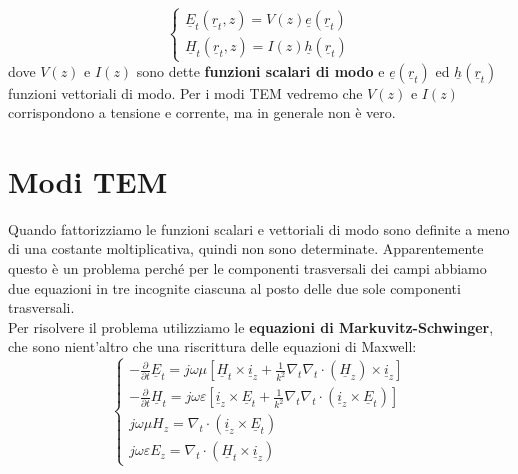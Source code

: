 \documentclass{book}
\begin{document}
        \begin{equation}
            \label{eqn:fattorizzazione_modi}
            \begin{cases}
                \underline{E}_{t}(\underline{r}_{t},z)=V(z)\underline{e}(\underline{r}_{t}) \\
                \underline{H}_{t}(\underline{r}_{t},z)=I(z)\underline{h}(\underline{r}_{t})
            \end{cases}
        \end{equation}
        dove $V(z)$ e $I(z)$ sono dette \textbf{funzioni scalari di modo} e $\underline{e}(\underline{r}_{t})$ ed $\underline{h}(\underline{r}_{t})$ funzioni 
        vettoriali di modo. Per i modi TEM vedremo che $V(z)$ e $I(z)$ corrispondono a tensione e corrente, ma in generale non è vero.
    \section{Modi TEM}
    Quando fattorizziamo le funzioni scalari e vettoriali di modo sono definite a meno di una costante moltiplicativa, quindi non sono determinate.
    Apparentemente questo è un problema perché per le componenti trasversali dei campi abbiamo due equazioni in tre incognite ciascuna al posto delle due sole
    componenti trasversali.\\
    Per risolvere il problema utilizziamo le \textbf{equazioni di Markuvitz-Schwinger}, che sono nient'altro 
    che una riscrittura delle equazioni di Maxwell:
    \begin{equation}
        \label{eqn:eq_Markuvitz-Schwinger}
        \begin{cases}
            \displaystyle -\frac{\partial}{\partial t}\underline{E}_{t}=j \omega \mu [\underline{H}_{t}\times \underline{i}_{z}+\displaystyle \frac{1}{k^{2}}\nabla_{t}\nabla_{t}\cdot (\underline{H}_{z}) \times \underline{i}_{z}] \\
            \displaystyle - \frac{\partial}{\partial t}\underline{H}_{t}=j\omega \varepsilon [\underline{i}_{z} \times \underline{E}_{t}+ \displaystyle \frac{1}{k^{2}}\nabla_{t} \nabla_{t} \cdot (\underline{i}_{z} \times \underline{E}_{t})] \\
            j \omega \mu H_{z} = \nabla_{t} \cdot (\underline{i}_{z} \times \underline{E}_{t}) \\
            j \omega \varepsilon E_{z}=\nabla_{t}\cdot (\underline{H}_{t} \times \underline{i}_{z})
        \end{cases}
    \end{equation}
\end{document}
